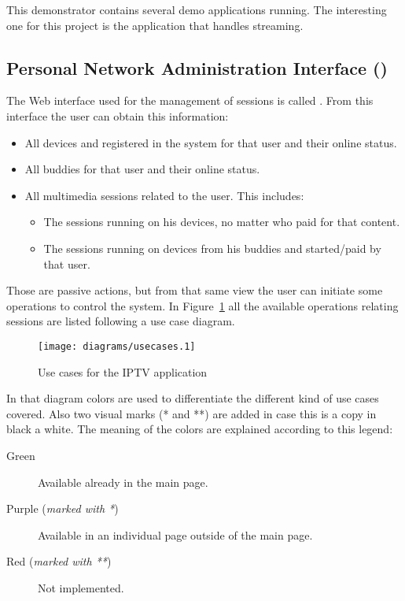 This demonstrator contains several demo applications running.
The interesting one for this project is the application that handles  streaming.

\nicesubsectionending


\subsection{Personal Network Administration Interface ()} %
\label{sub:pnai}

The Web interface used for the management of sessions is called . From this interface the user can obtain this information:

\begin{itemize}
  \item All devices and registered in the system for that user and their online status.
  \item All buddies for that user and their online status.
  \item All multimedia sessions related to the user. This includes:
  \begin{itemize}
    \item The sessions running on his devices, no matter who paid for that content.
    \item The sessions running on devices from his buddies and started/paid by that user.
  \end{itemize}
\end{itemize}

Those are passive actions, but from that same view the user can initiate some operations to control the system.
In Figure~\ref{fig:usecasesiptv} all the available operations relating sessions are listed following a use case diagram.

\begin{figure}[htbp]
  \centering
    \texttt{[image: diagrams/usecases.1]}
  \caption{Use cases for the IPTV application}
  \label{fig:usecasesiptv}
\end{figure}

In that diagram colors are used to differentiate the different kind of use cases covered. Also two visual marks (* and **) are added in case this is a copy in black a white. The meaning of the colors are explained according to this legend:

\begin{description}
  \item[Green] Available already in the main  page.
  \item[Purple (\emph{marked with *})] Available in an individual page outside of the main  page.
  \item[Red (\emph{marked with **})] Not implemented.
\end{description}

